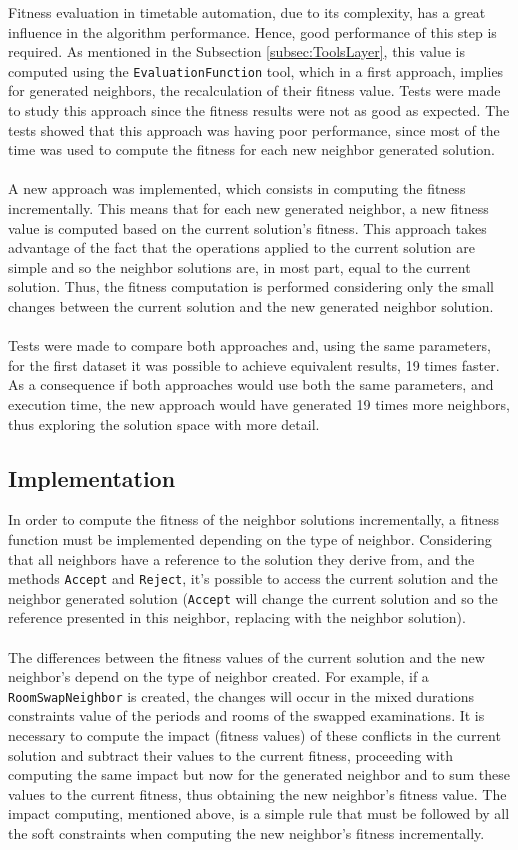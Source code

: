 Fitness evaluation in timetable automation, due to its complexity, has a great influence in the algorithm performance. Hence, good performance of this step is required. As mentioned in the Subsection \ref{subsec:ToolsLayer}, this value is computed using the \verb+EvaluationFunction+ tool, which in a first approach, implies for generated neighbors, the recalculation of their fitness value. Tests were made to study this approach since the fitness results were not as good as expected. The tests showed that this approach was having poor performance, since most of the time was used to compute the fitness for each new neighbor generated solution.\\
\\
A new approach was implemented, which consists in computing the fitness incrementally. This means that for each new generated neighbor, a new fitness value is computed based on the current solution's fitness. This approach takes advantage of the fact that the operations applied to the current solution are simple and so the neighbor solutions are, in most part, equal to the current solution. Thus, the fitness computation is performed considering only the small changes between the current solution and the new generated neighbor solution.\\
\\
Tests were made to compare both approaches and, using the same parameters, for the first dataset it was possible to achieve equivalent results, 19 times faster. As a consequence if both approaches would use both the same parameters, and execution time, the new approach would have generated 19 times more neighbors, thus exploring the solution space with more detail.

\subsection{Implementation}

In order to compute the fitness of the neighbor solutions incrementally, a fitness function must be implemented depending on the type of neighbor. Considering that all neighbors have a reference to the solution they derive from, and the methods \verb+Accept+ and \verb+Reject+, it's possible to access the current solution and the neighbor generated solution (\verb+Accept+ will change the current solution and so the reference presented in this neighbor, replacing with the neighbor solution). \\
\\
The differences between the fitness values of the current solution and the new neighbor's depend on the type of neighbor created. For example, if a \verb+RoomSwapNeighbor+ is created, the changes will occur in the mixed durations constraints value of the periods and rooms of the swapped examinations. It is necessary to compute the impact (fitness values) of these conflicts in the current solution and subtract their values to the current fitness, proceeding with computing the same impact but now for the generated neighbor and to sum these values to the current fitness, thus obtaining the new neighbor's fitness value. The impact computing, mentioned above, is a simple rule that must be followed by all the soft constraints when computing the new neighbor's fitness incrementally.